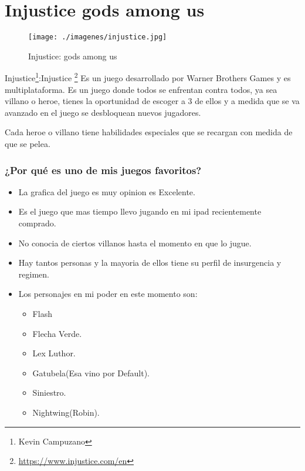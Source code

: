 \section{Injustice gods among us}

\begin{figure}[htbp]
\begin{center}
\texttt{[image: ./imagenes/injustice.jpg]}
\caption{Injustice: gods among us}
\label{Zelda: Skyward Sword}
\end{center}
\end{figure}
Injustice\footnote{Kevin Campuzano}:Injustice \footnote{\url{https://www.injustice.com/en}} Es un juego desarrollado por Warner Brothers Games y es multiplataforma. Es un juego donde todos se enfrentan contra todos, ya sea villano o heroe, tienes la oportunidad de escoger a 3 de ellos y a medida que se va avanzado en el juego se desbloquean nuevos jugadores.

Cada heroe o villano tiene habilidades especiales que se recargan con medida de que se pelea.

\subsubsection{¿Por qué es uno de mis juegos favoritos?}
\begin{itemize}
	\item La grafica del juego es muy opinion es Excelente.
	\item Es el juego que mas tiempo llevo jugando en mi ipad recientemente comprado.
	\item No conocia de ciertos villanos hasta el momento en que lo jugue.
	\item Hay tantos personas y la mayoria de ellos tiene su perfil de insurgencia y regimen.
	\item Los personajes en mi poder en este momento son:
		\begin{itemize}
			\item Flash
			\item Flecha Verde.
			\item Lex Luthor.
			\item Gatubela(Esa vino por Default).
			\item Siniestro.
			\item Nightwing(Robin).
		\end{itemize}	
\end{itemize}
